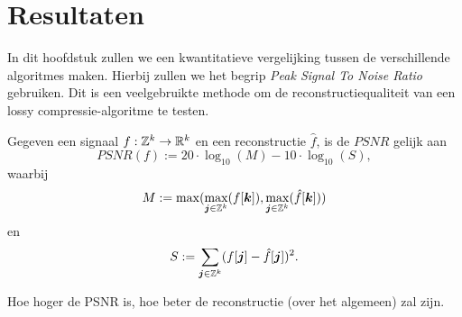 \chapter{Resultaten}
In dit hoofdstuk zullen we een kwantitatieve vergelijking tussen de verschillende algoritmes maken. Hierbij zullen we het begrip \emph{Peak Signal To Noise Ratio} gebruiken. Dit is een veelgebruikte methode om de reconstructiequaliteit van een lossy compressie-algoritme te testen.

\begin{definitie}
  Gegeven een signaal $f: \mathbb{Z}^k \to \mathbb{R}^k$ en een reconstructie $\hat f$, is de $PSNR$ gelijk aan
  \[
  PSNR(f) := 20 \cdot \log_{10}( M ) - 10 \cdot \log_{10}(S),
  \]
  waarbij
  \[
  M := \max( \max_{\boldsymbol j \in \mathbb{Z}^k} (f[\boldsymbol k]), \max_{\boldsymbol j \in \mathbb{Z}^k} (\hat f[\boldsymbol k]))
  \]
  en
  \[
  S := \sum_{\boldsymbol j \in \mathbb{Z}^k} (f[\boldsymbol j] - \hat f[\boldsymbol j])^2.
  \]

  Hoe hoger de PSNR is, hoe beter de reconstructie (over het algemeen) zal zijn.
\end{definitie}

